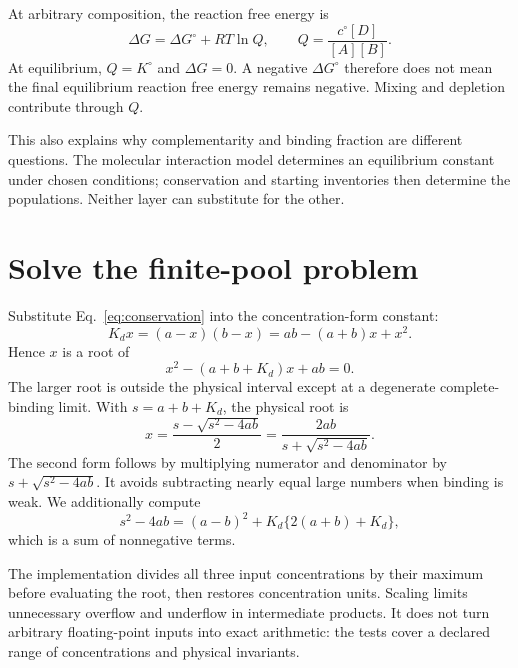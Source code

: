 At arbitrary composition, the reaction free energy is
\begin{equation}
\Delta G=\Delta G^\circ+RT\ln Q,\qquad
Q=\frac{c^\circ[D]}{[A][B]}.
\end{equation}
At equilibrium, $Q=K^\circ$ and $\Delta G=0$. A negative
$\Delta G^\circ$ therefore does not mean the final equilibrium reaction
free energy remains negative. Mixing and depletion contribute through $Q$.

This also explains why complementarity and binding fraction are different
questions. The molecular interaction model determines an equilibrium
constant under chosen conditions; conservation and starting inventories
then determine the populations. Neither layer can substitute for the other.

\section{Solve the finite-pool problem}

Substitute Eq.~\ref{eq:conservation} into the concentration-form constant:
\begin{equation}
K_dx=(a-x)(b-x)
       =ab-(a+b)x+x^2.
\end{equation}
Hence $x$ is a root of
\begin{equation}
x^2-(a+b+K_d)x+ab=0.
\end{equation}
The larger root is outside the physical interval except at a degenerate
complete-binding limit. With $s=a+b+K_d$, the physical root is
\begin{equation}
x=\frac{s-\sqrt{s^2-4ab}}{2}
 =\frac{2ab}{s+\sqrt{s^2-4ab}}.
\label{eq:root}
\end{equation}
The second form follows by multiplying numerator and denominator by
$s+\sqrt{s^2-4ab}$. It avoids subtracting nearly equal large numbers when
binding is weak. We additionally compute
\begin{equation}
s^2-4ab=(a-b)^2+K_d\{2(a+b)+K_d\},
\end{equation}
which is a sum of nonnegative terms.


The implementation divides all three input concentrations by their maximum
before evaluating the root, then restores concentration units. Scaling limits
unnecessary overflow and underflow in intermediate products. It does not
turn arbitrary floating-point inputs into exact arithmetic: the tests cover
a declared range of concentrations and physical invariants.

